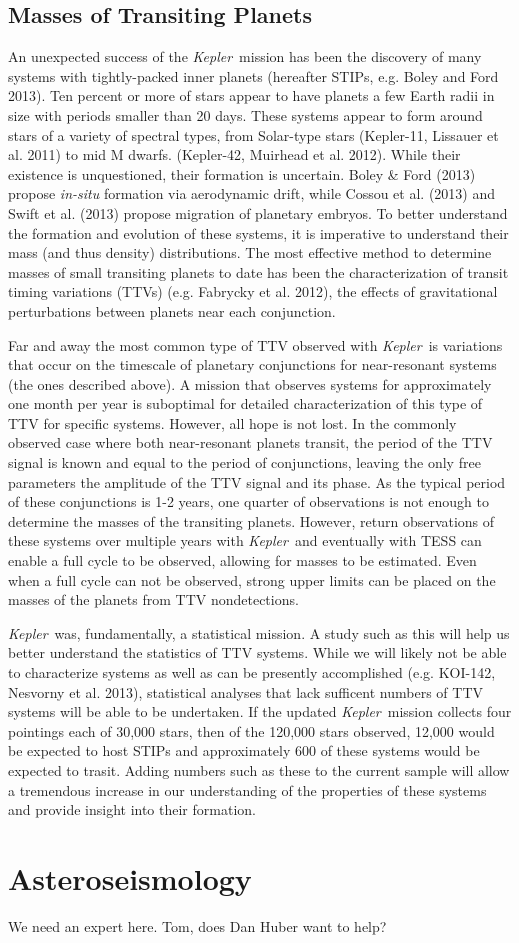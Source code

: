 \documentclass[12pt, preprint]{aastex}
\newcommand{\observatory}[1]{\textsl{#1}}
\newcommand{\kepler}{\observatory{Kepler}}
\newcommand{\Kepler}{\kepler}
\begin{document}
\subsection{Masses of Transiting Planets}
An unexpected success of the \Kepler\ mission has been the discovery of many 
 systems with tightly-packed inner planets (hereafter STIPs, e.g. Boley 
 and Ford 2013). 
Ten percent or more of stars appear to have planets a few Earth radii in size
 with periods smaller than 20 days. 
These systems appear to form around stars of a variety of spectral types, from 
 Solar-type stars (Kepler-11, Lissauer et al. 2011) to mid M dwarfs. 
 (Kepler-42, Muirhead et al. 2012).
While their existence is unquestioned, their formation is uncertain. 
Boley \& Ford (2013) propose \textit{in-situ} formation via aerodynamic drift, 
 while Cossou et al. (2013) and Swift et al. (2013) propose migration of 
 planetary embryos. 
To better understand the formation and evolution of these systems, it 
 is imperative to understand their mass (and thus density) distributions. 
The most effective method to determine masses of small transiting planets 
 to date has been the characterization of transit timing variations (TTVs) 
 (e.g. Fabrycky et al. 2012), the effects of gravitational perturbations
 between planets near each conjunction. 

Far and away the most common type of TTV observed with 
 \Kepler\ is variations that occur on the timescale of planetary conjunctions
 for near-resonant systems (the ones described above). 
A mission that observes systems for approximately one month per year is 
 suboptimal for detailed characterization of this type of TTV for specific 
 systems. 
However, all hope is not lost.
In the commonly observed case where both near-resonant planets transit, the 
 period of the TTV signal is known and equal to the period of conjunctions,
 leaving the only free parameters the amplitude of the TTV signal and its phase.
As the typical period of these conjunctions is 1-2 years, one quarter of
 observations is not enough to determine the masses of the transiting planets. 
However, return observations of these systems over multiple years with \Kepler\
 and eventually with TESS can enable a full cycle to be observed, allowing for 
 masses to be estimated. Even when a full cycle can not be observed, strong 
 upper limits can be placed on the masses of the planets from TTV nondetections.

\Kepler\ was, fundamentally, a statistical mission. 
A study such as this will  help us better understand the statistics of TTV 
 systems. 
While we will likely not be able to characterize systems as well as can be
 presently accomplished  (e.g. KOI-142, Nesvorny et al. 2013), statistical
 analyses that lack sufficent numbers of TTV systems will be able to be 
 undertaken. 
If the updated \Kepler\ mission collects four pointings each of 30,000 stars, 
 then of the 120,000 stars observed, 12,000 would be expected to host STIPs
 and approximately 600 of these systems would be expected to trasit.
Adding numbers such as these to the current sample will allow a tremendous 
 increase in our understanding of the properties of these systems and provide
 insight into their formation.


 

\section{Asteroseismology}
\label{AS}
We need an expert here. Tom, does Dan Huber want to help?
\end{document}
